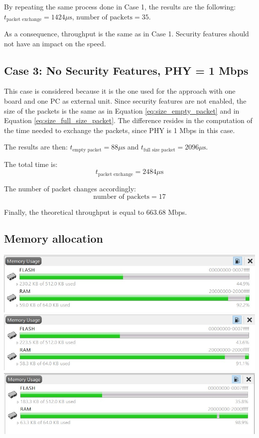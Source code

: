 \documentclass{Configuration_Files/PoliMi3i_thesis}
\begin{document}
By repeating the same process done in Case 1, the results are the following: $t_{\text{packet exchange}} = 1424 \mu \text{s}$, $\text{number of packets} = 35$.

As a consequence, throughput is the same as in Case 1. Security features should not have an impact on the speed.

\subsection*{Case 3: No Security Features, PHY = 1 Mbps}

This case is considered because it is the one used for the approach with one board and one PC as external unit. Since security features are not enabled, the size of the packets is the same as in Equation \ref{eq:size_empty_packet} and in Equation \ref{eq:size_full_size_packet}. The difference resides in the computation of the time needed to exchange the packets, since PHY is 1 Mbps in this case.

The results are then: $t_{\text{empty packet}} = 88 \mu \text{s}$ and $t_{\text{full size packet}} = 2096 \mu \text{s}$.

The total time is:
\begin{equation}
t_{\text{packet exchange}} = 2484 \mu \text{s}
\label{eq:packet_exchange_case3}
\end{equation}

The number of packet changes accordingly:
\begin{equation}
\text{number of packets} = 17
\label{eq:number_of_packets_case3}
\end{equation}

Finally, the theoretical throughput is equal to 663.68 Mbps.


\subsection{Memory allocation}

\includegraphics[scale=0.8]{MemoryAllocation/memory_shift.jpeg}
\includegraphics[scale=0.8]{MemoryAllocation/memory_sicurezza.jpeg}
\includegraphics[scale=0.8]{MemoryAllocation/memory_sicurezzaAndShift.jpeg}
\end{document}
